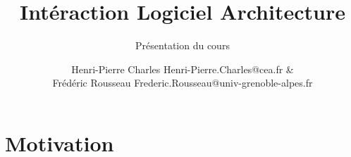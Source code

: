\documentclass{beamer}
\title{Intéraction Logiciel Architecture}
\subtitle{Présentation du cours}
\author{Henri-Pierre Charles Henri-Pierre.Charles@cea.fr \& \\
Frédéric Rousseau Frederic.Rousseau@univ-grenoble-alpes.fr}
\date{}
\newcommand{\Slide}[1]{}
\begin{document}
\titlepage
\section{Motivation}
\Slide{Presentation/Plan}
\Slide{Presentation/Bibliographie}
\end{document}
